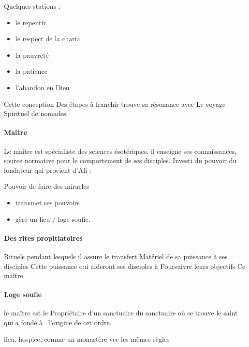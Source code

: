 Quelques stations : 
\begin{itemize}
   
\item le repentir
\item le respect de la charia
\item la pauvreté
\item la patience
\item l'abandon en Dieu
\end{itemize}

Cette conception 
Des étapes 
à franchir
trouve sa résonance avec 
Le voyage 
Spirituel de nomades. 

\paragraph{Maître}
Le maître est spécialiste des sciences ésotériques, il enseigne ses connaissances, source normative pour le comportement de ses disciples. Investi du pouvoir du fondateur qui provient d'Ali : 


\begin{Def}[Karamat]
    Pouvoir de faire des miracles
\end{Def}
\begin{itemize}
    \item transmet ses pouvoirs
    \item gère un lieu / loge soufie.
\end{itemize}

\paragraph{Des rites propitiatoires }

Rituels pendant lesquels il assure le transfert 
Matériel 
de sa puissance 
à  ses disciples 
Cette puissance 
qui  aideront ses disciples 
à  
Poursuivre leurs objectifs 
Ce maître 

\paragraph{Loge soufie}
le maître est le 
Propriétaire d'un sanctuaire du sanctuaire où se trouve le saint 
qui  a fondé à  l'origine de cet ordre. 
\begin{Def}[Khanqa]
  lieu, hospice,
  comme un monastère vec les mêmes règles 
\end{Def}

